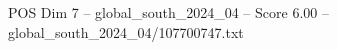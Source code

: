 \begin{textsample}{POS Dim 7 – global\_south\_2024\_04 – Score 6.00 – global\_south\_2024\_04/107700747.txt}
\end{textsample}
